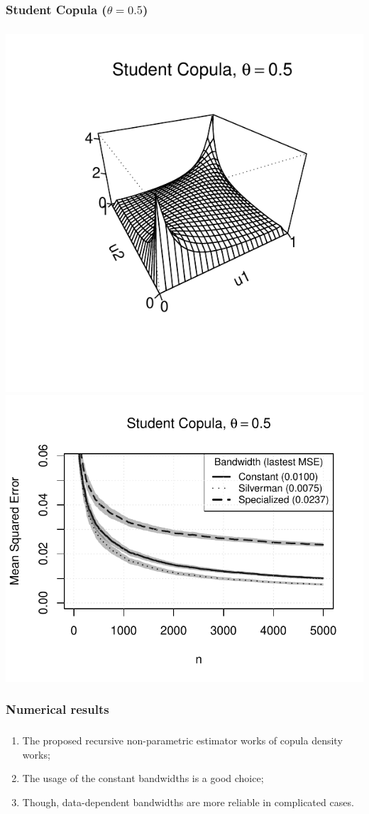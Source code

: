 \documentclass[aspectratio=169]{beamer}
\begin{document}
		\subsubsection{Student Copula ($ \theta = 0.5 $)}
			\begin{frame}
				\frametitle{\insertsubsubsection}
				
				\begin{flushleft}
					\includegraphics[width=0.4\linewidth]{plots/numerical_results/student05}
					\includegraphics[width=0.5\linewidth]{../text/plots/experiment_results/student05}
				\end{flushleft}
				
			\end{frame}
			
		\subsubsection{Numerical results}
			\begin{frame}
				\frametitle{\insertsubsubsection}
				
				\begin{enumerate}
					\item The proposed recursive non-parametric estimator works of copula density works;
					\item<2-> The usage of the constant bandwidths is a good choice;
					\item<3-> Though, data-dependent bandwidths are more reliable in complicated cases.
				\end{enumerate}
				
			\end{frame}	
	
\end{document}

